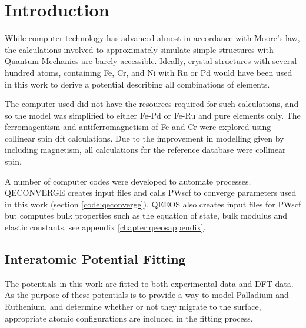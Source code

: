 \begin{changemargin}{1.0cm}{1.0cm}
\end{changemargin}



\section{Introduction}

While computer technology has advanced almost in accordance with Moore's law, the calculations involved to approximately simulate simple structures with Quantum Mechanics are barely accessible.  Ideally, crystal structures with several hundred atoms, containing Fe, Cr, and Ni with Ru or Pd would have been used in this work to derive a potential describing all combinations of elements.  

The computer used did not have the resources required for such calculations, and so the model was simplified to either Fe-Pd or Fe-Ru and pure elements only.  The ferromagentism and antiferromagnetism of Fe and Cr were explored using collinear spin \acrshort{dft} calculations.  Due to the improvement in modelling given by including magnetism, all calculations for the reference database were collinear spin.

A number of computer codes were developed to automate processes.  QECONVERGE creates input files and calls PWscf to converge parameters used in this work (section \ref{code:qeconverge}).  QEEOS also creates input files for PWscf but computes bulk properties such as the equation of state, bulk modulus and elastic constants, see appendix \ref{chapter:qeeosappendix}.

\subsection{Interatomic Potential Fitting}

The potentials in this work are fitted to both experimental data and DFT data.  As the purpose of these potentials is to provide a way to model Palladium and Ruthenium, and determine whether or not they migrate to the surface, appropriate atomic configurations are included in the fitting process.

